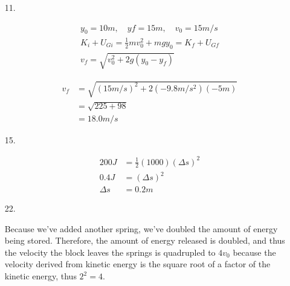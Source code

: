     \begin{itemize}
        \item [11.]
        
            \begin{equation*}
                \begin{gathered}
                    y_{0} = 10 m, \quad y{f} = 15 m, \quad v_{0} = 15 m/s               \\
                    K_{i} + U_{Gi} = \frac{1}{2}mv_{0}^{2} + mgy_{0} = K_{f} + U_{Gf}   \\
                    v_{f} = \sqrt{v_{0}^{2} + 2g(y_{0} - y_{f})} 
                \end{gathered}
            \end{equation*}

            \begin{align*}
                v_{f}   & = \sqrt{(15 m/s)^{2} + 2(-9.8 m/s^{2})(-5 m)} \\
                        & = \sqrt{225 + 98}                             \\
                        & = \boxed{18.0 m/s}
            \end{align*}
    
        \item [15.]
        
            \begin{align*}
                200 J   & = \frac{1}{2}(1000)(\Delta s)^{2}     \\
                0.4 J   & = (\Delta s)^{2}                      \\
                \Delta s& = \boxed{0.2 m}
            \end{align*}

        \item [22.]
        
            Because we've added another spring, we've doubled the amount of energy being stored. Therefore, the amount of energy released is doubled, and thus the velocity the block leaves the springs is quadrupled to $\boxed{4v_{0}}$ because the velocity derived from kinetic energy is the square root of a factor of the kinetic energy, thus $2^{2} = 4$.

    \end{itemize}

